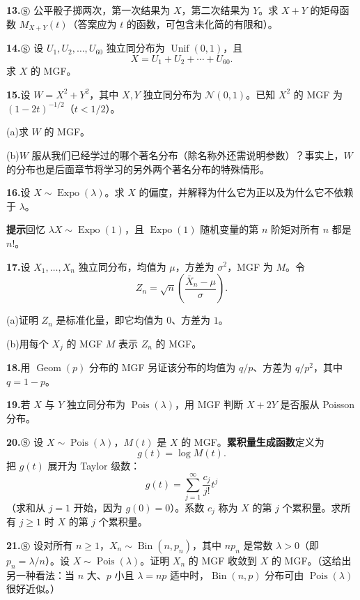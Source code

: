 \documentclass[UTF8, 12pt, fontset=fandol, oneside]{ctexart}
\begin{document}
\noindent\textbf{13.}\quad $\circledS$ 公平骰子掷两次，第一次结果为 $X$，第二次结果为 $Y$。求 $X+Y$ 的矩母函数 $M_{X+Y}(t)$（答案应为 $t$ 的函数，可包含未化简的有限和）。

\noindent\textbf{14.}\quad $\circledS$ 设 $U_1,U_2,\ldots,U_{60}$ 独立同分布为 $\operatorname{Unif}(0,1)$，且
\[
  X=U_1+U_2+\cdots+U_{60}.
\]
求 $X$ 的 MGF。

\noindent\textbf{15.}\quad 设 $W=X^2+Y^2$，其中 $X,Y$ 独立同分布为 $\mathcal{N}(0,1)$。已知 $X^2$ 的 MGF 为 $(1-2t)^{-1/2}$（$t<1/2$）。

\noindent (a)\quad 求 $W$ 的 MGF。

\noindent (b)\quad $W$ 服从我们已经学过的哪个著名分布（除名称外还需说明参数）？事实上，$W$ 的分布也是后面章节将学习的另外两个著名分布的特殊情形。

\noindent\textbf{16.}\quad 设 $X\sim\operatorname{Expo}(\lambda)$。求 $X$ 的偏度，并解释为什么它为正以及为什么它不依赖于 $\lambda$。

\noindent\textbf{提示}\quad 回忆 $\lambda X\sim\operatorname{Expo}(1)$，且 $\operatorname{Expo}(1)$ 随机变量的第 $n$ 阶矩对所有 $n$ 都是 $n!$。

\noindent\textbf{17.}\quad 设 $X_1,\ldots,X_n$ 独立同分布，均值为 $\mu$，方差为 $\sigma^2$，MGF 为 $M$。令
\[
  Z_n=\sqrt n\left(\frac{\bar X_n-\mu}{\sigma}\right).
\]

\noindent (a)\quad 证明 $Z_n$ 是标准化量，即它均值为 $0$、方差为 $1$。

\noindent (b)\quad 用每个 $X_j$ 的 MGF $M$ 表示 $Z_n$ 的 MGF。

\noindent\textbf{18.}\quad 用 $\operatorname{Geom}(p)$ 分布的 MGF 另证该分布的均值为 $q/p$、方差为 $q/p^2$，其中 $q=1-p$。

\noindent\textbf{19.}\quad 若 $X$ 与 $Y$ 独立同分布为 $\operatorname{Pois}(\lambda)$，用 MGF 判断 $X+2Y$ 是否服从 Poisson 分布。

\noindent\textbf{20.}\quad $\circledS$ 设 $X\sim\operatorname{Pois}(\lambda)$，$M(t)$ 是 $X$ 的 MGF。\textbf{累积量生成函数}定义为
\[
  g(t)=\log M(t).
\]
把 $g(t)$ 展开为 Taylor 级数：
\[
  g(t)=\sum_{j=1}^{\infty}\frac{c_j}{j!}t^j
\]
（求和从 $j=1$ 开始，因为 $g(0)=0$）。系数 $c_j$ 称为 $X$ 的第 $j$ 个累积量。求所有 $j\ge1$ 时 $X$ 的第 $j$ 个累积量。

\noindent\textbf{21.}\quad $\circledS$ 设对所有 $n\ge1$，$X_n\sim\operatorname{Bin}(n,p_n)$，其中 $np_n$ 是常数 $\lambda>0$（即 $p_n=\lambda/n$）。设 $X\sim\operatorname{Pois}(\lambda)$。证明 $X_n$ 的 MGF 收敛到 $X$ 的 MGF。（这给出另一种看法：当 $n$ 大、$p$ 小且 $\lambda=np$ 适中时，$\operatorname{Bin}(n,p)$ 分布可由 $\operatorname{Pois}(\lambda)$ 很好近似。）
\end{document}
